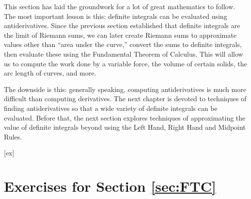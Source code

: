 %
%


This section has laid the groundwork for a lot of great mathematics to follow. The most important lesson is this: definite integrals can be evaluated using antiderivatives. Since the previous section established that definite integrals are the limit of Riemann sums, we can later create Riemann sums to approximate values other than ``area under the curve,'' convert the sums to definite integrals, then evaluate these using the Fundamental Theorem of Calculus. This will allow us to compute the work done by a variable force, the volume of certain solids, the arc length of curves, and more.

The downside is this: generally speaking, computing antiderivatives is much more difficult than computing derivatives. The next chapter is devoted to techniques of finding antiderivatives so that a wide variety of definite integrals can be evaluated. Before that, the next section explores techniques of approximating the value of definite integrals beyond using the Left Hand, Right Hand and Midpoint Rules.

[ex]
\section*{Exercises for Section \ref{sec:FTC}}

